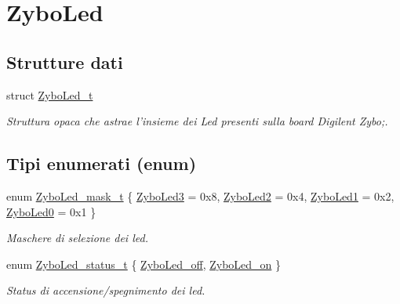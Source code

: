 \hypertarget{group___zybo_led}{\section{Zybo\+Led}
\label{group___zybo_led}
}
\subsection*{Strutture dati}
\begin{DoxyCompactItemize}
\item 
struct \hyperlink{struct_zybo_led__t}{Zybo\+Led\+\_\+t}
\begin{DoxyCompactList}\small\item\em Struttura opaca che astrae l'insieme dei Led presenti sulla board Digilent Zybo;. \end{DoxyCompactList}\end{DoxyCompactItemize}
\subsection*{Tipi enumerati (enum)}
\begin{DoxyCompactItemize}
\item 
enum \hyperlink{group___zybo_led_gad11701cccac394f7e1f90de8f85695f3}{Zybo\+Led\+\_\+mask\+\_\+t} \{ \hyperlink{group___zybo_led_ggad11701cccac394f7e1f90de8f85695f3adc5edc2adfd899da9f149cb61364b141}{Zybo\+Led3} = 0x8, 
\hyperlink{group___zybo_led_ggad11701cccac394f7e1f90de8f85695f3a4fa521f6fce7c4ba77d1d8144e71cdfc}{Zybo\+Led2} = 0x4, 
\hyperlink{group___zybo_led_ggad11701cccac394f7e1f90de8f85695f3ad71c06f65dfffcf825d48f287718d9be}{Zybo\+Led1} = 0x2, 
\hyperlink{group___zybo_led_ggad11701cccac394f7e1f90de8f85695f3ae1a1e8fa0bf803793ff27004884b85fe}{Zybo\+Led0} = 0x1
 \}
\begin{DoxyCompactList}\small\item\em Maschere di selezione dei led. \end{DoxyCompactList}\item 
enum \hyperlink{group___zybo_led_ga3dcb274f22e577705c49944b8d1f4b12}{Zybo\+Led\+\_\+status\+\_\+t} \{ \hyperlink{group___zybo_led_gga3dcb274f22e577705c49944b8d1f4b12a9679f1c302afdb51915a2331b4ec92f3}{Zybo\+Led\+\_\+off}, 
\hyperlink{group___zybo_led_gga3dcb274f22e577705c49944b8d1f4b12aafcf0ae16a6edec807c06bb0a99f7e8b}{Zybo\+Led\+\_\+on}
 \}
\begin{DoxyCompactList}\small\item\em Status di accensione/spegnimento dei led. \end{DoxyCompactList}\end{DoxyCompactItemize}
